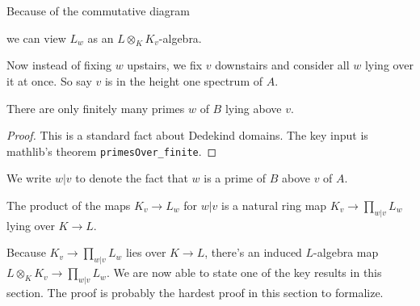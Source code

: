 Because of the commutative diagram
\begin{center}
\end{center}

we can view $L_w$ as an $L\otimes_KK_v$-algebra.

Now instead of fixing $w$ upstairs, we fix $v$ downstairs and consider all $w$ lying
over it at once. So say $v$ is in the height one spectrum of $A$.

\begin{lemma}
  \label{IsDedekindDomain.HeightOneSpectrum.Extension.finite}
  \leanok
  There are only finitely many primes $w$ of $B$ lying above $v$.
\end{lemma}
\begin{proof}
  \leanok
  This is a standard fact about Dedekind domains. The key input is
  mathlib's theorem {\tt primesOver\_finite}.
\end{proof}

We write $w|v$ to denote the fact that $w$ is a prime of $B$ above $v$ of $A$.

\begin{definition}
  \label{IsDedekindDomain.HeightOneSpectrum.adicCompletionComapSemialgHom'}
  \leanok
  The product of the maps $K_v\to L_w$ for $w|v$ is a natural ring map $K_v\to\prod_{w|v}L_w$
  lying over $K\to L$.
\end{definition}

Because $K_v\to\prod_{w|v}L_w$ lies over $K\to L$, there's an induced $L$-algebra
map $L\otimes_KK_v\to\prod_{w|v}L_w$. We are now able to state one of the key results
in this section. The proof is probably the hardest proof
in this section to formalize.

